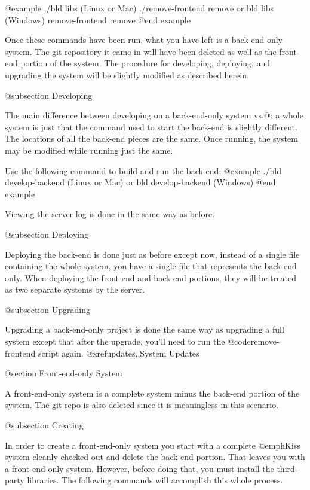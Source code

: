 @example
./bld libs                   (Linux or Mac)
./remove-frontend remove
    or
bld libs                     (Windows)
remove-frontend remove
@end example

Once these commands have been run, what you have left is a back-end-only system.  The git 
repository it came in will have been deleted as well as the front-end portion of the system.
The procedure for developing, deploying, and upgrading the system will be slightly modified as 
described herein.


@subsection Developing

The main difference between developing on a back-end-only system vs.@: a 
whole system is just that the command used to start the back-end is
slightly different.  The locations of all the back-end pieces are
the same.  Once running, the system may be modified while running just
the same.

Use the following command to build and run the back-end:
@example
./bld develop-backend         (Linux or Mac)
     or
bld develop-backend           (Windows)
@end example

Viewing the server log is done in the same way as before.


@subsection Deploying

Deploying the back-end is done just as before except now, instead of a single file containing the whole system, 
you have a single file that represents the back-end only.  When deploying the front-end and back-end portions,
they will be treated as two separate systems by the server.

@subsection Upgrading

Upgrading a back-end-only project is done the same way as upgrading a full system except that after the upgrade, you'll need to run the 
@code{remove-frontend} script again. @xref{updates,,System Updates}

@section Front-end-only System

A front-end-only system is a complete system minus the back-end portion of the system.
The git repo is also deleted since it is meaningless in this scenario.

@subsection Creating

In order to create a front-end-only system you start with a complete
@emph{Kiss} system cleanly checked out and delete the back-end
portion.  That leaves you with a front-end-only system.  However, before
doing that, you must install the third-party libraries.  The following
commands will accomplish this whole process.

